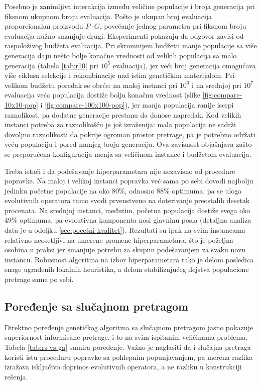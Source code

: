 \documentclass[12pt]{article}
\begin{document}
Posebno je zanimljiva interakcija između veličine populacije i broja generacija pri fiksnom ukupnom broju evaluacija. Pošto je ukupan broj evaluacija proporcionalan proizvodu $P \cdot G$, povećanje jednog parametra pri fiksnom broju evaluacija nužno smanjuje drugi. Eksperimenti pokazuju da odgovor zavisi od raspoloživog budžeta evaluacija. Pri skromnijem budžetu manje populacije sa više generacija daju nešto bolje konačne vrednosti od velikih populacija sa malo generacija (tabela \ref{tab:r10} pri $10^5$ evaluacija), jer veći broj generacija omogućava više ciklusa selekcije i rekombinacije nad istim genetičkim materijalom. Pri velikom budžetu poredak se obrće: na maloj instanci pri $10^6$ i na srednjoj pri $10^7$ evaluacija veća populacija dostiže bolju konačnu vrednost (slike \ref{fig:compare-10x10-pop} i \ref{fig:compare-100x100-pop}), jer manja populacija ranije iscrpi raznolikost, pa dodatne generacije prestanu da donose napredak. Kod velikih instanci potreba za raznolikošću je još izraženija: mala populacija ne sadrži dovoljno raznolikosti da pokrije ogroman prostor pretrage, pa je potrebno održati veću populaciju i pored manjeg broja generacija. Ova zavisnost objašnjava zašto se preporučena konfiguracija menja sa veličinom instance i budžetom evaluacija.

Treba istaći i da podešavanje hiperparametara nije nezavisno od procedure popravke. Na maloj i velikoj instanci popravka već sama po sebi dovodi najbolju jedinku početne populacije na oko 80\%, odnosno 88\% optimuma, pa se uloga evolutivnih operatora tamo svodi prvenstveno na doterivanje preostalih desetak procenata. Na srednjoj instanci, međutim, početna populacija dostiže svega oko 49\% optimuma, pa evolutivna komponenta nosi glavninu posla (detaljna analiza data je u odeljku \ref{sec:pocetni-kvalitet}). Rezultati su ipak na svim instancama relativno neosetljivi na umerene promene hiperparametara, što je poželjna osobina u praksi jer smanjuje potrebu za skupim podešavanjem za svaku novu instancu. Robusnost algoritma na izbor hiperparametara tako je delom posledica snage ugrađenih lokalnih heuristika, a delom stabilizujućeg dejstva populacione pretrage same po sebi.

\subsection{Poređenje sa slučajnom pretragom}

Direktno poređenje genetičkog algoritma sa slučajnom pretragom jasno pokazuje superiornost informisane pretrage, i to na svim ispitanim veličinama problema. Tabela \ref{tab:rs-vs-ga} sumira poređenje. Važno je naglasiti da i slučajna pretraga koristi istu proceduru popravke sa pohlepnim popunjavanjem, pa merena razlika izražava isključivo doprinos evolutivnih operatora, a ne razliku u konstrukciji rešenja.
\end{document}
